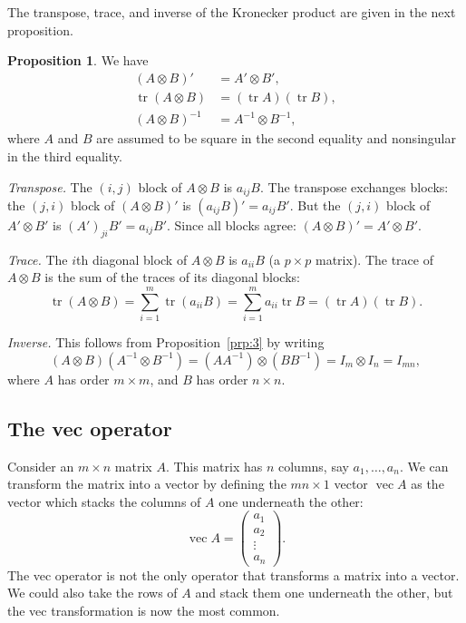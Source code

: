\documentclass[12pt,a4paper]{article}
\makeatletter
\theoremstyle{definition}
\newtheorem{proposition}{Proposition}
\renewenvironment{proof}[1][\proofname]{\par
  \pushQED{\qed}%
  \normalfont \topsep6\p@\@plus6\p@\relax
  \trivlist
  \item[\hskip\labelsep\bfseries #1\@addpunct{.}]\ignorespaces
}{%
  \popQED\endtrivlist\@endpefalse
}
\DeclareMathOperator{\tr}{tr}
\DeclareMathOperator{\avec}{vec}
\makeatother
\begin{document}
The transpose, trace, and inverse of the Kronecker product are given in the next proposition. %

\begin{proposition}\label{prp:4}
We have
\begin{align*}
(A \otimes B)' &= A' \otimes B', \\
\tr(A \otimes B) &= (\tr A)(\tr B), \\
(A \otimes B)^{-1} &= A^{-1} \otimes B^{-1},
\end{align*}
where $A$ and $B$ are assumed to be square in the second equality and nonsingular in the third equality. %
\end{proposition}

\begin{proof}
\emph{Transpose.}
The $(i,j)$ block of $A \otimes B$ is $a_{ij}B$.
The transpose exchanges blocks: the $(j,i)$ block of $(A \otimes B)'$ is $(a_{ij}B)' = a_{ij}B'$.
But the $(j,i)$ block of $A' \otimes B'$ is $(A')_{ji} B' = a_{ij} B'$.
Since all blocks agree: $(A \otimes B)' = A' \otimes B'$.

\emph{Trace.}
The $i$th diagonal block of $A \otimes B$ is $a_{ii}B$ (a $p \times p$ matrix).
The trace of $A \otimes B$ is the sum of the traces of its diagonal blocks:
\[
\tr(A \otimes B) = \sum_{i=1}^m \tr(a_{ii}B) = \sum_{i=1}^m a_{ii} \tr B = (\tr A)(\tr B).
\]

\emph{Inverse.}
This follows from Proposition~\ref{prp:3} by writing
\[
(A \otimes B)(A^{-1} \otimes B^{-1}) = (AA^{-1}) \otimes (BB^{-1}) = I_m \otimes I_n = I_{mn},
\]
where $A$ has order $m \times m$, and $B$ has order $n \times n$. %
\end{proof}

\subsection{The vec operator}\label{sec:2.4}

Consider an $m \times n$ matrix $A$. This matrix has $n$ columns, say $a_1, \dots, a_n$. We can transform the matrix into a vector by defining the $mn \times 1$ vector $\avec A$ as the vector which stacks the columns of $A$ one underneath the other:
\begin{equation}\label{eq:3}
\avec A = \begin{pmatrix} a_1 \\ a_2 \\ \vdots \\ a_n \end{pmatrix}.
\end{equation}
The vec operator is not the only operator that transforms a matrix into a vector. We could also take the rows of $A$ and stack them one underneath the other, but the vec transformation is now the most common. %
\end{document}

